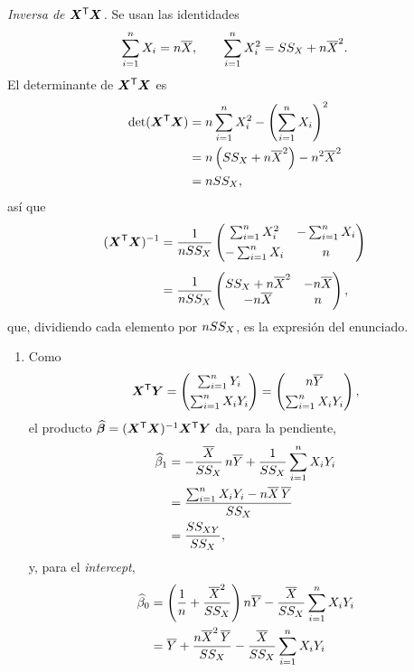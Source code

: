\begin{demostracion}
  \emph{Inversa de $\bm{X}^{\mathsf{T}}\bm{X}$.} Se usan las identidades
  \[
    \sum_{i=1}^{n} X_i = n\overline{X},
    \qquad
    \sum_{i=1}^{n} X_i^2 = SS_X + n\overline{X}^2 .
  \]
  El determinante de $\bm{X}^{\mathsf{T}}\bm{X}$ es
  \begin{align*}
    \det(\bm{X}^{\mathsf{T}}\bm{X}) &= n\sum_{i=1}^{n} X_i^2-\left(\sum_{i=1}^{n} X_i\right)^2 \\
    &= n\left(SS_X+n\overline{X}^2\right) - n^2\overline{X}^2 \\
    &= nSS_X ,
  \end{align*}
  así que
  \begin{align*}
    (\bm{X}^{\mathsf{T}}\bm{X})^{-1} &= \frac{1}{nSS_X}\begin{pmatrix} \sum_{i=1}^{n} X_i^2 & -\sum_{i=1}^{n} X_i\\[4pt] -\sum_{i=1}^{n} X_i & n \end{pmatrix} \\[4pt]
    &= \frac{1}{nSS_X}\begin{pmatrix} SS_X+n\overline{X}^2 & -n\overline{X}\\ -n\overline{X} & n \end{pmatrix} ,
  \end{align*}
  que, dividiendo cada elemento por $nSS_X$, es la expresión del enunciado.
  \begin{enumerate}
    \item Como
      \[
        \bm{X}^{\mathsf{T}}\bm{Y} = \begin{pmatrix} \sum_{i=1}^{n} Y_i\\[4pt] \sum_{i=1}^{n} X_iY_i \end{pmatrix}
        = \begin{pmatrix} n\overline{Y}\\[4pt] \sum_{i=1}^{n} X_iY_i \end{pmatrix},
      \]
      el producto $\widehat{\bm{\beta}}=(\bm{X}^{\mathsf{T}}\bm{X})^{-1}\bm{X}^{\mathsf{T}}\bm{Y}$ da, para la pendiente,
      \begin{align*}
        \widehat{\beta}_1 &= -\frac{\overline{X}}{SS_X}\,n\overline{Y}+\frac{1}{SS_X}\sum_{i=1}^{n} X_iY_i \\
        &= \frac{\sum_{i=1}^{n} X_iY_i-n\overline{X}\,\overline{Y}}{SS_X} \\
        &= \frac{SS_{XY}}{SS_X} ,
      \end{align*}
      y, para el \emph{intercept},
      \begin{align*}
        \est{\beta}_0 &= \left(\frac1n+\frac{\media{X}^2}{\SSX}\right)n\media{Y}
          - \frac{\media{X}}{\SSX}\sumi X_iY_i \\
        &= \media{Y} + \frac{n\media{X}^2\,\media{Y}}{\SSX} - \frac{\media{X}}{\SSX}\sumi X_iY_i \\

\end{align*}
\end{enumerate}
\end{demostracion}
